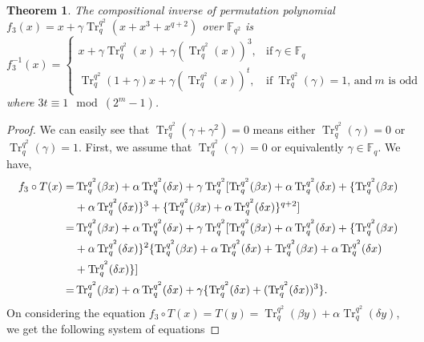 \documentclass{birkjour}
\newtheorem{thm}{Theorem}[section]
\theoremstyle{definition}
\theoremstyle{remark}
\numberwithin{equation}{section}
\begin{document}
\begin{thm} The compositional inverse of permutation polynomial 
		$f_3(x)=x+\gamma\operatorname{Tr}_{q}^{q^2}(x+x^3+x^{q+2})$ over $\mathbb{F}_{q^2}$ is \\
	$f_3^{-1}(x)=\begin{cases}x+\gamma\operatorname{Tr}_{q}^{q^2}(x)+\gamma(\operatorname{Tr}_{q}^{q^2}(x))^3,& \text{if}~\gamma\in\mathbb{F}_q\\
	\operatorname{Tr}_{q}^{q^2}(1+\gamma)x+\gamma(\operatorname{Tr}_{q}^{q^2}(x))^t,& \text{if}~\operatorname{Tr}_{q}^{q^2}(\gamma)=1\text{, } \text{and}~ m \text{ is odd}
	\end{cases}$\\
	where $3t\equiv 1\mod{(2^m-1)}$.
\end{thm}
\begin{proof} We can easily see that $\operatorname{Tr}_{q}^{q^2}(\gamma+\gamma^2)=0$ means either $\operatorname{Tr}_{q}^{q^2}(\gamma)=0$ or $\operatorname{Tr}_{q}^{q^2}(\gamma)=1$. First, we assume that $\operatorname{Tr}_{q}^{q^2}(\gamma)=0$ or equivalently $\gamma \in \mathbb{F}_{q}$. We have,
	\begin{align}
		f_3\circ T(x)=&\operatorname{Tr}_{q}^{q^2}(\beta x)+\alpha\operatorname{Tr}_{q}^{q^2}(\delta x)+\gamma\operatorname{Tr}_{q}^{q^2}[\operatorname{Tr}_{q}^{q^2}(\beta x)+\alpha\operatorname{Tr}_{q}^{q^2}(\delta x)+\{\operatorname{Tr}_{q}^{q^2}(\beta x)\notag\\&+\alpha\operatorname{Tr}_{q}^{q^2}(\delta x)\}^3+\{\operatorname{Tr}_{q}^{q^2}(\beta x)+\alpha\operatorname{Tr}_{q}^{q^2}(\delta x)\}^{q+2}]\notag\\
		=&\operatorname{Tr}_{q}^{q^2}(\beta x)+\alpha\operatorname{Tr}_{q}^{q^2}(\delta x)+\gamma\operatorname{Tr}_{q}^{q^2}[\operatorname{Tr}_{q}^{q^2}(\beta x)+\alpha\operatorname{Tr}_{q}^{q^2}(\delta x)+\{\operatorname{Tr}_{q}^{q^2}(\beta x)\notag\\&+\alpha\operatorname{Tr}_{q}^{q^2}(\delta x)\}^2\{\operatorname{Tr}_{q}^{q^2}(\beta x)+\alpha\operatorname{Tr}_{q}^{q^2}(\delta x)+\operatorname{Tr}_{q}^{q^2}(\beta x)+\alpha\operatorname{Tr}_{q}^{q^2}(\delta x)\notag\\&+\operatorname{Tr}_{q}^{q^2}(\delta x)\}]\notag\\
		=&\operatorname{Tr}_{q}^{q^2}(\beta x)+\alpha\operatorname{Tr}_{q}^{q^2}(\delta x)+\gamma\{\operatorname{Tr}_{q}^{q^2}(\delta x)+(\operatorname{Tr}_{q}^{q^2}(\delta x))^3\}.\label{3a}
	\end{align}
	On considering the equation $f_3 \circ T(x)=T(y)=\operatorname{Tr}_{q}^{q^2}(\beta y)+\alpha\operatorname{Tr}_{q}^{q^2}(\delta y)$, we get the following system of equations

\end{proof}
\end{document}
